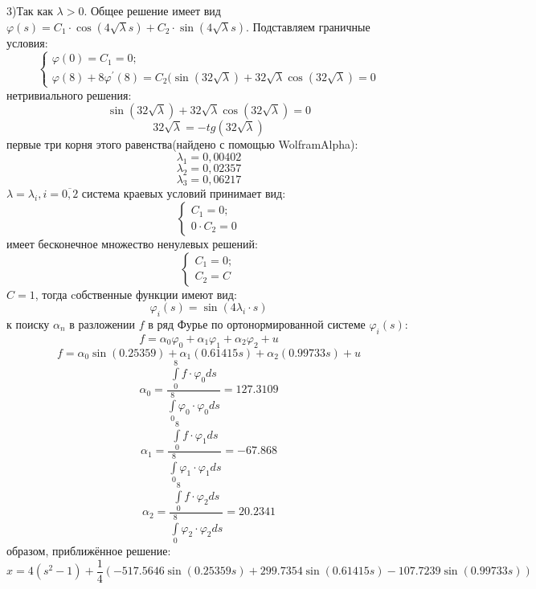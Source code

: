 \documentclass[12pt]{article}
\begin{document}
3)Так как $\lambda>0$. Общее решение имеет вид $\varphi(s)=C_1\cdot \cos(4\sqrt{\lambda}s)+
C_2\cdot \sin(4 \sqrt{\lambda}s)$. Подставляем граничные условия:
\begin{equation*}
 \begin{cases}
   \varphi(0)=C_1=0; 
   \\
   \varphi(8)+8\varphi^{'}(8)=
   C_2(\sin(32\sqrt{\lambda})+
   32\sqrt{\lambda} \cos(32\sqrt{\lambda})=0
 \end{cases}
\end{equation*}
 нетривиального решения:
$$\sin(32\sqrt{\lambda})+
32\sqrt{\lambda} \cos(32\sqrt{\lambda}) = 0$$
$$32\sqrt{\lambda}=-tg(32\sqrt{\lambda})$$
 первые три корня этого равенства(найдено с помощью WolframAlpha):\\
$$\lambda_1=0,00402$$
$$\lambda_2=0,02357$$
$$\lambda_3=0,06217$$
 $\lambda = \lambda_i, i = \overline{0,2}$ система краевых условий принимает вид:
\begin{equation*}
	\begin{cases}
		C_1=0; 
		\\
		0 \cdot C_2 =0
	\end{cases}
\end{equation*}
 имеет бесконечное множество ненулевых решений:
\begin{equation*}
	\begin{cases}
		C_1=0; 
		\\
		C_2 = C
	\end{cases}
\end{equation*}
 $C = 1$, тогда cобственные функции имеют вид:
$$\varphi_i(s)=\sin(4 \lambda_i \cdot s)$$
 к поиску $\alpha_n$ в разложении $f$ в ряд Фурье по ортонормированной 
системе $\varphi_i(s)$:\\
$$f=\alpha_0\varphi_0+\alpha_1\varphi_1+\alpha_2\varphi_2+u$$
$$f=\alpha_0 \sin(0.25359)+\alpha_1(0.61415s)+\alpha_2(0.99733s)+u$$
$$\alpha_0=\frac{\int\limits_{0}^{8}f\cdot\varphi_0ds}{\int\limits_{0}^{8}\varphi_0\cdot\varphi_0ds} = 127.3109$$
$$\alpha_1=\frac{\int\limits_{0}^{8}f\cdot\varphi_1ds}{\int\limits_{0}^{8}\varphi_1\cdot\varphi_1ds} = -67.868$$
$$\alpha_2=\frac{\int\limits_{0}^{8}f\cdot\varphi_2ds}{\int\limits_{0}^{8}\varphi_2\cdot\varphi_2ds} = 20.2341$$
 образом, приближённое решение:
$$x=4(s^2-1)+\frac{1}{4}(-517.5646 \sin(0.25359s) + 299.7354 \sin(0.61415s)-107.7239 \sin(0.99733s))$$
\end{document}
